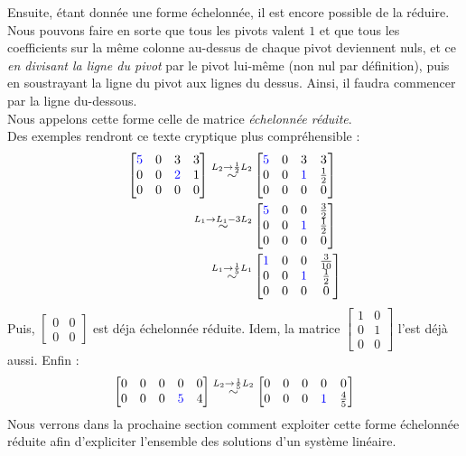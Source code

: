 \documentclass{article}
\begin{document}
\noindent Ensuite, étant donnée une forme échelonnée, il est encore possible de la réduire. Nous pouvons faire en sorte que tous les pivots valent $1$ et que tous les coefficients sur la même colonne au-dessus de chaque pivot deviennent nuls, et ce \textit{en divisant la ligne du pivot} par le pivot lui-même (non nul par définition), puis en soustrayant la ligne du pivot aux lignes du dessus. Ainsi, il faudra commencer par la ligne du-dessous.\\
Nous appelons cette forme celle de matrice \textit{échelonnée réduite}.\\
Des exemples rendront ce texte cryptique  plus compréhensible :
\begin{align*}
\begin{bmatrix}
\color{blue}5 & 0 & 3 & 3\\
0 & 0 & \color{blue}2 & 1\\
0 & 0 & 0 & 0
\end{bmatrix} \overset{L_2 \to  \frac{1}{2}L_2}{\sim} 
&\begin{bmatrix}
\color{blue}5 & 0 & 3 & 3\\
0 & 0 & \color{blue}1 & \frac{1}{2}\\
0 & 0 & 0 & 0
\end{bmatrix}\\
\overset{L_1 \to L_1 - 3L_2}{\sim}
&\begin{bmatrix}
\color{blue}5 & 0 & 0 & \frac{3}{2}\\
0 & 0 & \color{blue}1 & \frac{1}{2}\\
0 & 0 & 0 & 0
\end{bmatrix}\\
\overset{L_1 \to \frac{1}{5}L_1}{\sim}
&\begin{bmatrix}
\color{blue}1 & 0 & 0 & \frac{3}{10}\\
0 & 0 & \color{blue}1 & \frac{1}{2}\\
0 & 0 & 0 & 0
\end{bmatrix}
\end{align*}
Puis, $\begin{bmatrix}
0 &0\\
0 & 0
\end{bmatrix}$ est déja échelonnée réduite. Idem, la matrice $\begin{bmatrix}
1 & 0\\
0 & 1\\
0 & 0
\end{bmatrix}$ l'est déjà aussi. Enfin :
\begin{align*}
\begin{bmatrix}
0 & 0 & 0 & 0 & 0 \\
0 & 0 & 0 & \color{blue}5 & 4
\end{bmatrix}
\overset{L_2 \to \frac{1}{5}L_2}{\sim}
\begin{bmatrix}
0 & 0 & 0 & 0 & 0 \\
0 & 0 & 0 & \color{blue}1 & \frac{4}{5}
\end{bmatrix}
\end{align*}
Nous verrons dans la prochaine section comment exploiter cette forme échelonnée réduite afin d'expliciter l'ensemble des solutions d'un système linéaire.\\
\end{document}

